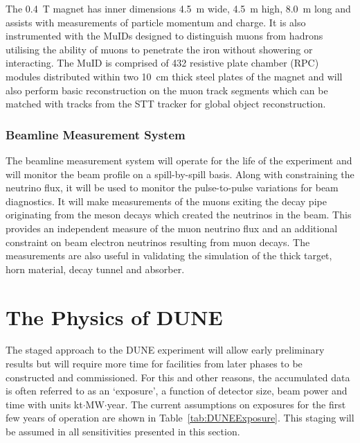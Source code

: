 The 0.4~T magnet has inner dimensions 4.5~m wide, 4.5~m high, 8.0~m long and assists with measurements of particle momentum and charge.  It is also instrumented with the MuIDs designed to distinguish muons from hadrons utilising the ability of muons to penetrate the iron without showering or interacting.  The MuID is comprised of 432 resistive plate chamber (RPC) modules distributed within two 10~cm thick steel plates of the magnet and will also perform basic reconstruction on the muon track segments which can be matched with tracks from the STT tracker for global object reconstruction.

\subsubsection{Beamline Measurement System}\label{sec:BLM}

The beamline measurement system will operate for the life of the experiment and will monitor the beam profile on a spill-by-spill basis.  Along with constraining the neutrino flux, it will be used to monitor the pulse-to-pulse variations for beam diagnostics.  It will make measurements of the muons exiting the decay pipe originating from the meson decays which created the neutrinos in the beam.  This provides an independent measure of the muon neutrino flux and an additional constraint on beam electron neutrinos resulting from muon decays.  The measurements are also useful in validating the simulation of the thick target, horn material, decay tunnel and absorber.

\section{The Physics of DUNE}\label{sec:DUNEPhysics}

The staged approach to the DUNE experiment will allow early preliminary results but will require more time for facilities from later phases to be constructed and commissioned.  For this and other reasons, the accumulated data is often referred to as an `exposure', a function of detector size, beam power and time with units kt$\cdot$MW$\cdot$year.  The current assumptions on exposures for the first few years of operation are shown in Table~\ref{tab:DUNEExposure}.  This staging will be assumed in all sensitivities presented in this section.

